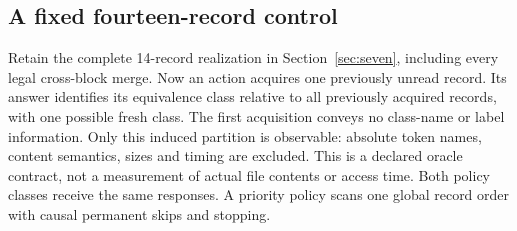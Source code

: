 \documentclass[pdflatex,sn-mathphys-num]{sn-jnl}
\theoremstyle{thmstyleone}
\theoremstyle{thmstylethree}
\theoremstyle{thmstyletwo}
\begin{document}
\subsection{A fixed fourteen-record control}
Retain the complete 14-record realization in Section~\ref{sec:seven}, including every legal cross-block merge. Now an action acquires one previously unread record. Its answer identifies its equivalence class relative to all previously acquired records, with one possible fresh class. The first acquisition conveys no class-name or label information. Only this induced partition is observable: absolute token names, content semantics, sizes and timing are excluded. This is a declared oracle contract, not a measurement of actual file contents or access time. Both policy classes receive the same responses. A priority policy scans one global record order with causal permanent skips and stopping.
\end{document}
